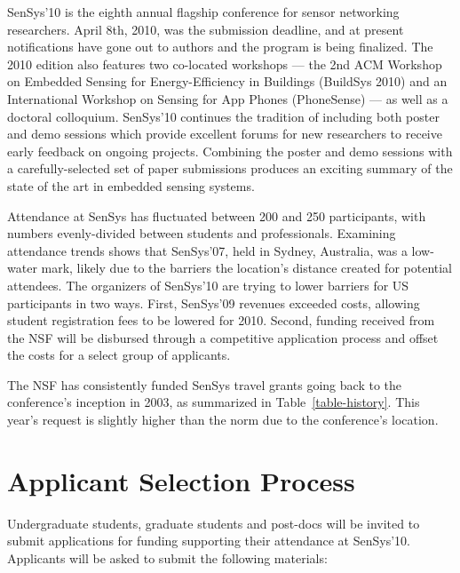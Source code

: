 SenSys'10 is the eighth annual flagship conference for sensor networking
researchers. April 8th, 2010, was the submission deadline, and at present
notifications have gone out to authors and the program is being finalized.
The 2010 edition also features two co-located workshops --- the 2nd ACM
Workshop on Embedded Sensing for Energy-Efficiency in Buildings (BuildSys
2010) and an International Workshop on Sensing for App Phones (PhoneSense)
--- as well as a doctoral colloquium. SenSys'10 continues the tradition of
including both poster and demo sessions which provide excellent forums for
new researchers to receive early feedback on ongoing projects. Combining the
poster and demo sessions with a carefully-selected set of paper submissions
produces an exciting summary of the state of the art in embedded sensing
systems.

Attendance at SenSys has fluctuated between 200 and 250 participants, with
numbers evenly-divided between students and professionals. Examining
attendance trends shows that SenSys'07, held in Sydney, Australia, was a
low-water mark, likely due to the barriers the location's distance created
for potential attendees. The organizers of SenSys'10 are trying to lower
barriers for US participants in two ways. First, SenSys'09 revenues exceeded
costs, allowing student registration fees to be lowered for 2010. Second,
funding received from the NSF will be disbursed through a competitive
application process and offset the costs for a select group of applicants.

The NSF has consistently funded SenSys travel grants going back to the
conference's inception in 2003, as summarized in Table~\ref{table-history}.
This year's request is slightly higher than the norm due to the conference's
location.

\section{Applicant Selection Process}

Undergraduate students, graduate students and post-docs will be invited to
submit applications for funding supporting their attendance at SenSys'10.
Applicants will be asked to submit the following materials:

